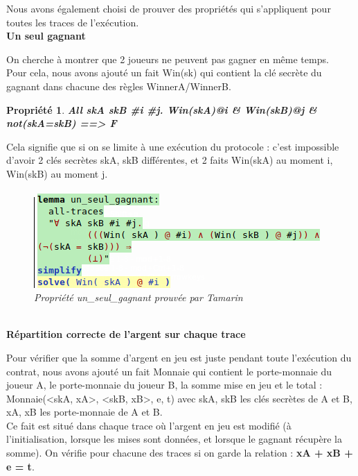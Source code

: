 \documentclass[conference]{IEEEtran}
\newtheorem{theo}{Propriété}
\begin{document}
\vspace{0.2cm}
Nous avons également choisi de prouver des propriétés qui s'appliquent pour toutes les traces de l'exécution.
\vspace{0.3cm}\\

\textbf{Un seul gagnant} 

On cherche à montrer que 2 joueurs ne peuvent pas gagner en même temps. \\
Pour cela, nous avons ajouté un fait Win(sk) qui contient la clé secrète du gagnant dans chacune des règles WinnerA/WinnerB.
\vspace{0.2cm}
\begin{theo}
\textbf{All skA skB #i #j. Win(skA)@i & Win(skB)@j & not(skA=skB) ==> F}
\end{theo}
\vspace{0.3cm}
Cela signifie que si on se limite à une exécution du protocole : c'est impossible d'avoir 2 clés secrètes skA, skB différentes, et 2 faits Win(skA) au moment i, Win(skB) au moment j.



\begin{figure}[!h]
    \centering
    \includegraphics[scale=0.62]{ungagnant.png}
    \caption{\textit{Propriété un\_seul\_gagnant prouvée par Tamarin}}
    \label{fig:my_label}
\end{figure}\\


\textbf{Répartition correcte de l'argent sur chaque trace} 

Pour vérifier que la somme d'argent en jeu est juste pendant toute l'exécution du contrat, nous avons ajouté un fait Monnaie qui contient le porte-monnaie du joueur A, le porte-monnaie du joueur B, la somme mise en jeu et le total : Monnaie(<skA, xA>, <skB, xB>, e, t) avec skA, skB les clés secrètes de A et B, xA, xB les porte-monnaie de A et B. \\

Ce fait est situé dans chaque trace où l'argent en jeu est modifié (à l'initialisation, lorsque les mises sont données, et lorsque le gagnant récupère la somme). On vérifie pour chacune des traces si on garde la relation : \textbf{xA + xB + e = t}.\\
\end{document}
